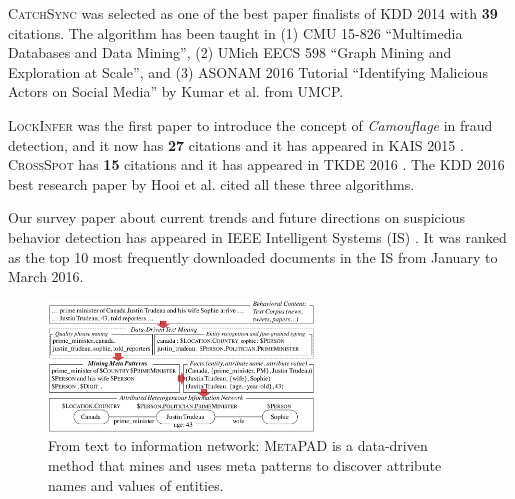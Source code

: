 \documentclass[10.5pt]{article}
\begin{document}
\begin{compactitem}
\item \textsc{CatchSync} \cite{jiang2014catchsync} was selected as one of the best paper finalists of KDD 2014 with \textbf{39} citations. The algorithm has been taught in (1) CMU 15-826 ``Multimedia Databases and Data Mining'', (2) UMich EECS 598 ``Graph Mining and Exploration at Scale'', and (3) ASONAM 2016 Tutorial ``Identifying Malicious Actors on Social Media'' by Kumar et al. from UMCP.
\item \textsc{LockInfer} \cite{jiang2014inferring} was the first paper to introduce the concept of \textit{Camouflage} in fraud detection, and it now has \textbf{27} citations and it has appeared in KAIS 2015 \cite{jiang2015inferring}. \textsc{CrossSpot} \cite{jiang2015general} has \textbf{15} citations and it has appeared in TKDE 2016 \cite{jiang2016spotting}. The KDD 2016 best research paper by Hooi et al. cited all these three algorithms.
\item Our survey paper about current trends and future directions on suspicious behavior detection has appeared in IEEE Intelligent Systems (IS) \cite{jiang2016suspicious}. It was ranked as the top 10 most frequently downloaded documents in the IS from January to March 2016.
\end{compactitem}

\vskip 0.05in
\vskip 0.01in


\begin{figure}
\vskip -0.18in
\includegraphics[width=0.63\textwidth]{figure/metapad.pdf}
\vskip -0.18in
\caption{From text to information network: \textsc{MetaPAD} \cite{jiang2016metapad} is a data-driven method that mines and uses meta patterns to discover attribute names and values of entities.}
\label{fig:metapad}
\vskip -0.12in
\end{figure}
\end{document}
